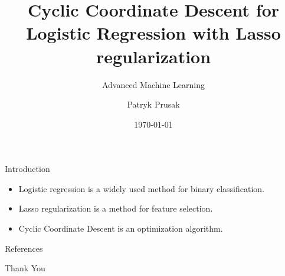 \documentclass[12pt]{beamer}
\title{Cyclic Coordinate Descent for Logistic Regression with Lasso regularization}
\subtitle{Advanced Machine Learning}
\date{\footnotesize\today}
\author{Patryk Prusak}
\institute{Warsaw University of Technology}
\begin{document}
\maketitle

\begin{frame}{Introduction}
    \begin{itemize}
        \item Logistic regression is a widely used method for binary classification.
        \item Lasso regularization is a method for feature selection.
        \item Cyclic Coordinate Descent is an optimization algorithm.
    \end{itemize}
\end{frame}


\begin{frame}{References}
    
    
  
  \end{frame}
  
  
  \begin{frame}[standout]{}
  
  Thank You
  
  \end{frame}
\end{document}
